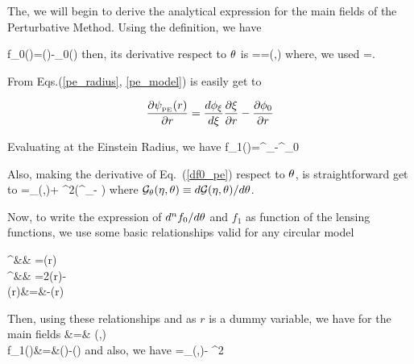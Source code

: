 The, we will begin to derive the analytical expression for the main fields of the Perturbative Method. Using the 
definition, we have

\beq
f_0(\te)=\phi(\xer)-\phi_0(\re)
\eeq
then, its derivative respect to $\theta$ is
\beq
{}==\dfrac{\phi^\prime_{\xer}}{\xer}\scriptg(\eta,\te)
\label{df0_pe}
\eeq
where, we used 
\beq
{}=\dfrac{\scriptg(\eta,\te)}{\xer}.                 
\label{dxer_pe}
\eeq

From Eqs.{(\ref{pe_radius}, \ref{pe_model})} is easily get to

\begin{equation*}
\dfrac{\partial \psi_{_{\mathrm{PE}}}(r) }{\partial r}=\dfrac{d\phi_\xi}{d\xi}\dfrac{\partial \xi}{\partial r}-\dfrac{\partial \phi_0}{\partial r}
\end{equation*}

Evaluating at the Einstein Radius, we have
\beq
f_1(\te)=\dfrac{\xer}{\re}\phi^\prime_{\xer}-\phi^\prime_0
\label{f1_pe}
\eeq

Also, making the derivative of Eq.~(\ref{df0_pe}) respect to $\theta$, is straightforward get to
\beq
{}=\scriptg_\te(\eta,\te)\dfrac{\phi^\prime_{\xer}}{\xer}+%
\left[ \dfrac{\scriptg(\eta,\te)}{\xer}\right]^2\left(\phi^{\prime\prime}_{\xer}-\dfrac{\phi^{\prime}_{\xer}}{\xer}  \right)
\label{ddf0_pe}
\eeq
where $\mathcal{G}_\theta(\eta,\theta)\equiv d\mathcal{G}(\eta,\theta)/d\theta$.

Now, to write the expression of $d^nf_0/d\theta$ and $f_1$ as function of the lensing functions, we use some basic relationships valid for
any circular model

\bea
\phi^\prime &\equiv& =\alpha(r) \label{dphi}\\
\phi^{\prime\prime}&\equiv& =2\kappa(r)-\label{ddphi}\\
\gamma(r)&=&-\kappa(r) \label{shear_gen}
\eea

Then, using these relationships and as $r$ is a dummy variable, we have for the main fields
\bea
{}&=& \dfrac{\alpha(\xer)}{\xer}\scriptg(\eta,\te) \label{df0_pe2}\\
f_1(\te)&=&\dfrac{\xer}{\re}\alpha(\xer)-\alpha(\re) \label{f1_pe2}
\eea
and also, we have
\beq
\label{ddf0_pe2}
=\scriptg_\te(\eta,\te)\dfrac{\alpha(\xer)}{\xer}-%
\left[ \dfrac{\scriptg(\eta,\te)}{\xer}\right]^2 
\eeq

